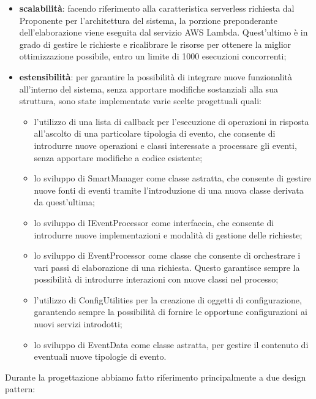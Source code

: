 \begin{itemize}
	\item \textbf{scalabilità}: facendo riferimento alla caratteristica serverless richiesta dal Proponente per l'architettura del sistema, la porzione preponderante dell'elaborazione viene eseguita dal servizio AWS Lambda. Quest'ultimo è in grado di gestire le richieste e ricalibrare le risorse per ottenere la miglior ottimizzazione possibile, entro un limite di 1000 esecuzioni concorrenti;
	\item \textbf{estensibilità}: per garantire la possibilità di integrare nuove funzionalità all'interno del sistema, senza apportare modifiche sostanziali alla sua struttura, sono state implementate varie scelte progettuali quali:
	\begin{itemize}
		\item l'utilizzo di una lista di callback per l'esecuzione di operazioni in risposta all'ascolto di una particolare tipologia di evento, che consente di introdurre nuove operazioni e classi interessate a processare gli eventi, senza apportare modifiche a codice esistente;
		\item lo sviluppo di SmartManager come classe astratta, che consente di gestire nuove fonti di eventi tramite l'introduzione di una nuova classe derivata da quest'ultima;
		\item lo sviluppo di IEventProcessor come interfaccia, che consente di introdurre nuove implementazioni e modalità di gestione delle richieste;
		\item lo sviluppo di EventProcessor come classe che consente di orchestrare i vari passi di elaborazione di una richiesta. Questo garantisce sempre la possibilità di introdurre interazioni con nuove classi nel processo;
		\item l'utilizzo di ConfigUtilities per la creazione di oggetti di configurazione, garantendo sempre la possibilità di fornire le opportune configurazioni ai nuovi servizi introdotti;
		\item lo sviluppo di EventData come classe astratta, per gestire il contenuto di eventuali nuove tipologie di evento.	
	\end{itemize}
\end{itemize}
Durante la progettazione abbiamo fatto riferimento principalmente a due design pattern:

